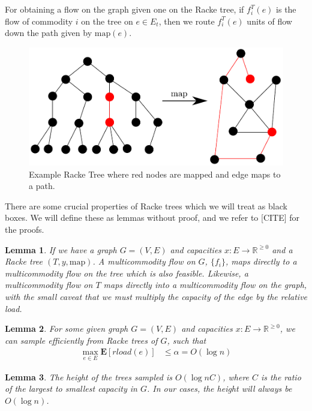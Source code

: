 \documentclass[12pt]{article}
\newtheorem{lemma}{Lemma}
\begin{document}
For obtaining a flow on the graph given one on the Racke tree, if $f_i^T(e)$ is the flow of commodity $i$ on the tree on $e \in E_t$, then we route $f_i^T(e)$ units of flow down the path given by $\text{map}(e)$.   

\begin{figure}
\label{fig:racketree}
\centering
\includegraphics[width=\linewidth]{Rackeembeddinggraph.pdf}
\caption{Example Racke Tree where red nodes are mapped and edge maps to a path.}
\end{figure}

There are some crucial properties of Racke trees which we will treat as black boxes. We will define these as lemmas without proof, and we refer to [CITE] for the proofs.

\begin{lemma}
\label{lem:mapflows}
If we have a graph $G = (V, E)$ and capacities $x: E \rightarrow \mathbb{R}^{\geq 0}$ and a Racke tree $(T, y, \text{map})$. A multicommodity flow on $G$, $\{ f_i \}$, maps directly to a multicommodity flow on the tree which is also feasible. Likewise, a multicommodity flow on $T$ maps directly into a multicommodity flow on the graph, with the small caveat that we must multiply the capacity of the edge by the relative load. 
\end{lemma}

\begin{lemma}
\label{lem:rload}
For some given graph $G = (V, E)$ and capacities $x: E \rightarrow \mathbb{R}^{\geq 0}$, we can sample efficiently from Racke trees of $G$, such that 
\begin{align}
\max_{e \in E} \textbf{E}[rload(e)] &\leq \alpha = O(\log n) 
\end{align}
\end{lemma}

\begin{lemma}
\label{thm:height}
The height of the trees sampled is $O(\log nC)$, where $C$ is the ratio of the largest to smallest capacity in $G$. In our cases, the height will always be $O(\log n)$. 
\end{lemma}
\end{document}

